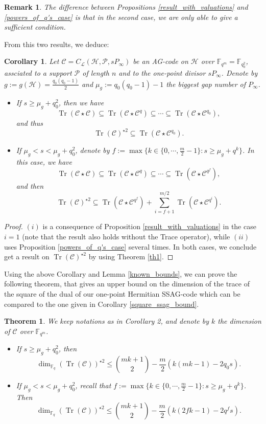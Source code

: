 \documentclass[a4paper]{article}
\newtheorem{coro1}{Corollary}
\newtheorem{thm}{Theorem}
\newtheorem{rq1}{Remark}
\newcommand{\calP}{\mathcal{P}}
\newcommand{\calH}{\mathcal{H}}
\newcommand{\calL}{\mathcal{L}}
\newcommand{\calC}{\mathcal{C}}
\newcommand{\Tr}{\operatorname{Tr}}
\newcommand{\fqm}{\mathbb{F}_{q^m}}
\newcommand{\fq}{\mathbb{F}_{q}}
\begin{document}
\begin{rq1}
The difference between Propositions \ref{result_with_valuations} and \ref{powers_of_q's_case} is that in the second case, we are only able to give a sufficient condition.
\end{rq1} 

From this two results, we deduce:

\begin{coro1} \label{coro2}
Let $\calC = C_{\calL}(\calH,\calP,sP_{\infty})$ be an AG-code on $\calH$ over $\mathbb{F}_{q^m}=\mathbb{F}_{q_0^2}$, assciated to a support $\calP$ of length $n$ and to the one-point divisor $sP_{\infty}$. Denote by $g:=g(\calH)=\frac{q_0(q_0-1)}{2}$ and $\mu_g := q_0(q_0-1)-1$ the biggest gap number of $P_{\infty}$. 
\begin{itemize}
    \item[(i)] If $s \geq \mu_g + q_0^2$, then we have 
        \[\Tr(\calC \star \calC) \subseteq \Tr(\calC \star \calC^q) \subseteq \cdots \subseteq \Tr(\calC \star \calC^{q_0}),\]
        and thus 
        \[\Tr(\calC)^{\star 2} \subseteq \Tr(\calC \star \calC^{q_0}).\]
    \item[(ii)] If $\mu_g < s < \mu_g +q_0^2$, denote by $f:= \max\{k \in \{0,\cdots,\frac{m}{2}-1\} : s \geq \mu_g + q^k\}$. In this case, we have 
        \[\Tr(\calC \star \calC) \subseteq \Tr(\calC \star \calC^q) \subseteq \cdots \subseteq \Tr(\calC \star \calC^{q^f}),\]
          and then
        \[\Tr(\calC)^{\star 2} \subseteq \Tr(\calC \star \calC^{q^f}) + \sum\limits_{i=f+1}^{m/2} \Tr(\calC \star \calC^{q^i}).\]
\end{itemize}
\end{coro1}

\begin{proof}
$(i)$ is a consequence of Proposition \ref{result_with_valuations} in the case $i=1$ (note that the result also holds without the Trace operator), while $(ii)$ uses Proposition \ref{powers_of_q's_case} several times. In both cases, we conclude get a result on $\Tr(\calC)^{\star 2}$ by using Theorem \ref{th1}.
\end{proof}

Using the above Corollary and Lemma \ref{known_bounds}, we can prove the following theorem, that gives an upper bound on the dimension of the trace of the square of the dual of our one-point Hermitian SSAG-code which can be compared to the one given in Corollary \ref{square_ssag_bound}.

\begin{thm} \label{sup_bounds_on_codes}
We keep notations as in Corollary 2, and denote by $k$ the dimension of $\calC$ over $\fqm$.
\begin{itemize}
\item[(i)] If $s \geq \mu_g + q_0^2$, then 
\[ \dim_{\fq}(\Tr(\calC))^{\star 2} \leq \binom{mk+1}{2} - \dfrac{m}{2} (k(mk-1)-2q_0s).\]
\item[(ii)] If $\mu_g < s < \mu_g +q_0^2$, recall that $f:= \max\{k \in \{0,\cdots,\frac{m}{2}-1\} : s \geq \mu_g + q^k\}$. Then 
\[ \dim_{\fq}(\Tr(\calC))^{\star 2} \leq \binom{mk+1}{2} - \dfrac{m}{2}(k(2fk-1)-2q^fs).\]
\end{itemize}
\end{thm}
\end{document}
